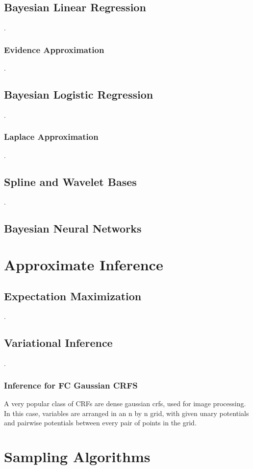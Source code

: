 \documentclass[12pt]{article}
\begin{document}
\subsection{Bayesian Linear Regression}
.
\subsubsection{Evidence Approximation}
.
\subsection{Bayesian Logistic Regression}
.
\subsubsection{Laplace Approximation}
.
\subsection{Spline and Wavelet Bases}
.
\subsection{Bayesian Neural Networks}

\section{Approximate Inference}

\subsection{Expectation Maximization}
.
\subsection{Variational Inference}
.
\subsubsection{Inference for FC Gaussian CRFS}

A very popular class of CRFs are dense gaussian crfs, used for image processing. In this case, variables are arranged in an n by n grid, with given unary potentials and pairwise potentials between every pair of points in the grid.

\section{Sampling Algorithms}
\end{document}
